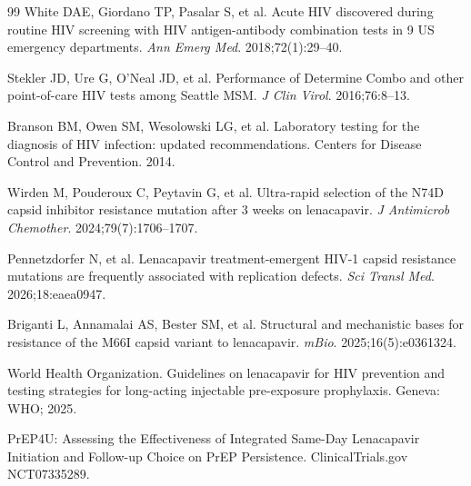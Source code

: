 \documentclass[12pt]{article}
\begin{document}
\begin{thebibliography}{99}
 White DAE, Giordano TP, Pasalar S, et al. Acute HIV discovered during routine HIV screening with HIV antigen-antibody combination tests in 9 US emergency departments. \textit{Ann Emerg Med}. 2018;72(1):29--40.

 Stekler JD, Ure G, O'Neal JD, et al. Performance of Determine Combo and other point-of-care HIV tests among Seattle MSM. \textit{J Clin Virol}. 2016;76:8--13.

 Branson BM, Owen SM, Wesolowski LG, et al. Laboratory testing for the diagnosis of HIV infection: updated recommendations. Centers for Disease Control and Prevention. 2014.

 Wirden M, Pouderoux C, Peytavin G, et al. Ultra-rapid selection of the N74D capsid inhibitor resistance mutation after 3 weeks on lenacapavir. \textit{J Antimicrob Chemother}. 2024;79(7):1706--1707.

 Pennetzdorfer N, et al. Lenacapavir treatment-emergent HIV-1 capsid resistance mutations are frequently associated with replication defects. \textit{Sci Transl Med}. 2026;18:eaea0947.

 Briganti L, Annamalai AS, Bester SM, et al. Structural and mechanistic bases for resistance of the M66I capsid variant to lenacapavir. \textit{mBio}. 2025;16(5):e0361324.

 World Health Organization. Guidelines on lenacapavir for HIV prevention and testing strategies for long-acting injectable pre-exposure prophylaxis. Geneva: WHO; 2025.

 PrEP4U: Assessing the Effectiveness of Integrated Same-Day Lenacapavir Initiation and Follow-up Choice on PrEP Persistence. ClinicalTrials.gov NCT07335289.

\end{thebibliography}
\end{document}
